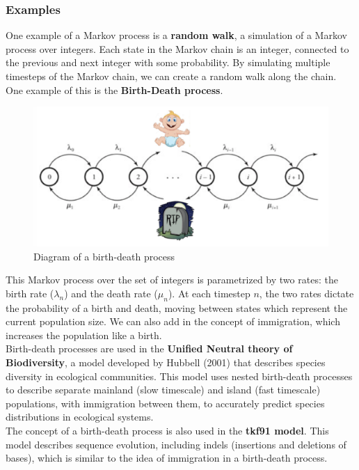 \documentclass[12pt]{article}
\begin{document}
\subsubsection{Examples}
One example of a Markov process is a \textbf{random walk}, a simulation of a Markov process over integers. Each state in the Markov chain is an integer, connected to the previous and next integer with some probability. By simulating multiple timesteps of the Markov chain, we can create a random walk along the chain.\\[10pt]
One example of this is the \textbf{Birth-Death process}.
\begin{figure}[h]
    \centering
    \includegraphics[width = .7\linewidth]{bd_proc.png}
    \caption{Diagram of a birth-death process}
    \label{fig:bd}
\end{figure}
This Markov process over the set of integers is parametrized by two rates: the birth rate ($\lambda_n$) and the death rate ($\mu_n$). At each timestep $n$, the two rates dictate the probability of a birth and death, moving between states which represent the current population size. We can also add in the concept of immigration, which increases the population like a birth.\\[10pt]
Birth-death processes are used in the \textbf{Unified Neutral theory of Biodiversity}, a model developed by Hubbell (2001) that describes species diversity in ecological communities. This model uses nested birth-death processes to describe separate mainland (slow timescale) and island (fast timescale) populations, with immigration between them, to accurately predict species distributions in ecological systems.\\[10pt]
The concept of a birth-death process is also used in the \textbf{tkf91 model}. This model describes sequence evolution, including indels (insertions and deletions of bases), which is similar to the idea of immigration in a birth-death process.
\end{document}
